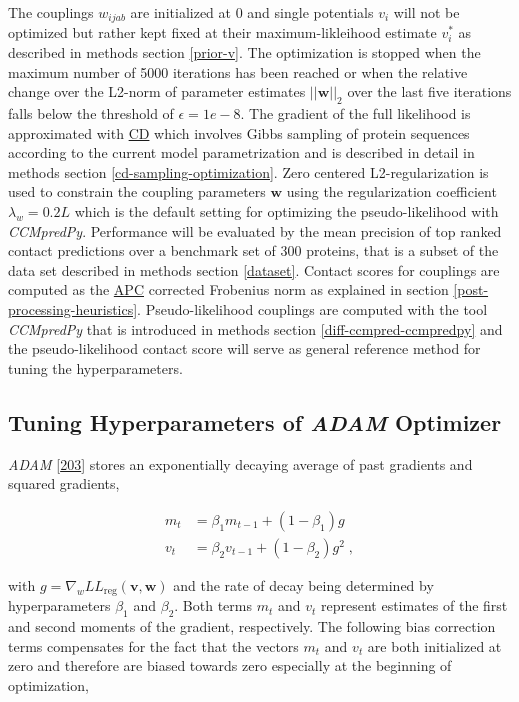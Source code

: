 \documentclass[11pt,a4paper,twoside]{book}
\newcommand{\LLreg}{L\!L_\mathrm{reg}}
\renewcommand{\v}{\mathbf{v}}
\newcommand{\vi}{v_{i}}
\newcommand{\w}{\mathbf{w}}
\newcommand{\wijab}{w_{ijab}}
\theoremstyle{definition}
\theoremstyle{definition}
\theoremstyle{remark}
\begin{document}
The couplings \(\wijab\) are initialized at 0 and single potentials
\(\vi\) will not be optimized but rather kept fixed at their
maximum-likleihood estimate \(\vi^*\) as described in methods section
\ref{prior-v}. The optimization is stopped when the maximum number of
5000 iterations has been reached or when the relative change over the
L2-norm of parameter estimates \(||\w||_2\) over the last five
iterations falls below the threshold of \(\epsilon = 1e-8\). The
gradient of the full likelihood is approximated with
\protect\hyperlink{abbrev}{CD} which involves Gibbs sampling of protein
sequences according to the current model parametrization and is
described in detail in methods section \ref{cd-sampling-optimization}.
Zero centered L2-regularization is used to constrain the coupling
parameters \(\w\) using the regularization coefficient
\(\lambda_w = 0.2L\) which is the default setting for optimizing the
pseudo-likelihood with \emph{CCMpredPy}. Performance will be evaluated
by the mean precision of top ranked contact predictions over a benchmark
set of 300 proteins, that is a subset of the data set described in
methods section \ref{dataset}. Contact scores for couplings are computed
as the \protect\hyperlink{abbrev}{APC} corrected Frobenius norm as
explained in section \ref{post-processing-heuristics}. Pseudo-likelihood
couplings are computed with the tool \emph{CCMpredPy} that is introduced
in methods section \ref{diff-ccmpred-ccmpredpy} and the
pseudo-likelihood contact score will serve as general reference method
for tuning the hyperparameters.

\subsection{\texorpdfstring{Tuning Hyperparameters of \emph{ADAM}
Optimizer}{Tuning Hyperparameters of ADAM Optimizer}}\label{methods-full-likelihood-adam}

\emph{ADAM} {[}\protect\hyperlink{ref-Kingma2014}{203}{]} stores an
exponentially decaying average of past gradients and squared gradients,

\begin{align}
  m_t &= \beta_1 m_{t−1} + (1 − \beta_1) g \\
  v_t &= \beta_2 v_{t−1} + (1 − \beta_2) g^2 \; ,
\end{align}

with \(g = \nabla_w \LLreg(\v,\w)\) and the rate of decay being
determined by hyperparameters \(\beta_1\) and \(\beta_2\). Both terms
\(m_t\) and \(v_t\) represent estimates of the first and second moments
of the gradient, respectively. The following bias correction terms
compensates for the fact that the vectors \(m_t\) and \(v_t\) are both
initialized at zero and therefore are biased towards zero especially at
the beginning of optimization,
\end{document}
